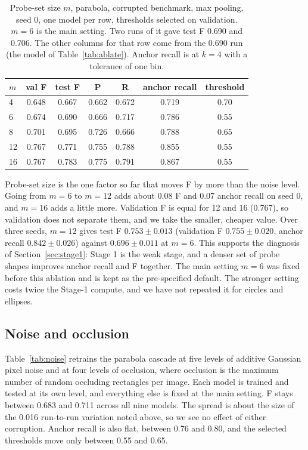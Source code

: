 \documentclass[11pt]{article}
\begin{document}
\begin{table}[t]
\centering
\caption{Probe-set size $m$, parabola, corrupted benchmark, max pooling, seed 0, one model per row, thresholds selected on validation. $m=6$ is the main setting. Two runs of it gave test F 0.690 and 0.706. The other columns for that row come from the 0.690 run (the model of Table~\ref{tab:ablate}). Anchor recall is at $k=4$ with a tolerance of one bin.}
\label{tab:probes}
\small
\begin{tabular}{lcccccc}
\toprule
$m$ & \textbf{val F} & \textbf{test F} & \textbf{P} & \textbf{R} & \textbf{anchor recall} & \textbf{threshold} \\
\midrule
4  & 0.648 & 0.667 & 0.662 & 0.672 & 0.719 & 0.70 \\
6  & 0.674 & 0.690 & 0.666 & 0.717 & 0.786 & 0.55 \\
8  & 0.701 & 0.695 & 0.726 & 0.666 & 0.788 & 0.65 \\
12 & 0.767 & 0.771 & 0.755 & 0.788 & 0.855 & 0.55 \\
16 & 0.767 & 0.783 & 0.775 & 0.791 & 0.867 & 0.55 \\
\bottomrule
\end{tabular}
\end{table}

Probe-set size is the one factor so far that moves F by more than the noise level. Going from $m=6$ to $m=12$ adds about 0.08 F and 0.07 anchor recall on seed 0, and $m=16$ adds a little more. Validation F is equal for 12 and 16 (0.767), so validation does not separate them, and we take the smaller, cheaper value. Over three seeds, $m=12$ gives test F $0.753\pm0.013$ (validation F $0.755\pm0.020$, anchor recall $0.842\pm0.026$) against $0.696\pm0.011$ at $m=6$. This supports the diagnosis of Section~\ref{sec:stage1}: Stage 1 is the weak stage, and a denser set of probe shapes improves anchor recall and F together. The main setting $m=6$ was fixed before this ablation and is kept as the pre-specified default. The stronger setting costs twice the Stage-1 compute, and we have not repeated it for circles and ellipses.

\subsection{Noise and occlusion}
\label{sec:noise}
Table~\ref{tab:noise} retrains the parabola cascade at five levels of additive Gaussian pixel noise and at four levels of occlusion, where occlusion is the maximum number of random occluding rectangles per image. Each model is trained and tested at its own level, and everything else is fixed at the main setting. F stays between 0.683 and 0.711 across all nine models. The spread is about the size of the 0.016 run-to-run variation noted above, so we see no effect of either corruption. Anchor recall is also flat, between 0.76 and 0.80, and the selected thresholds move only between 0.55 and 0.65.
\end{document}
